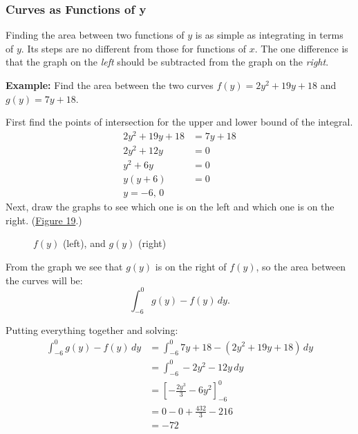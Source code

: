\documentclass[12pt]{article}
\begin{document}
\subsubsection{Curves as Functions of y}
Finding the area between two functions of $y$ is as simple as integrating in terms of $y$. Its steps are no different from those for functions of $x$. The one difference is that the graph on the \textit{left} should be subtracted from the graph on the \textit{right}.

\noindent \textbf{Example:} Find the area between the two curves $f(y)=2y^2 + 19y + 18$ and $g(y)=7y + 18$.

\noindent First find the points of intersection for the upper and lower bound of the integral.
\begin{align*}
    2y^2 + 19y + 18 & = 7y + 18 \\
    2y^2 + 12y      & = 0       \\
    y^2 + 6y        & = 0       \\
    y(y+6)          & = 0       \\
    y = -6, \, 0
\end{align*}
Next, draw the graphs to see which one is on the left and which one is on the right. (\hyperref[fig:abcy1]{Figure 19}.)

\begin{figure}[H]
    \begin{center}
        \caption{$f(y)$ (left), and $g(y)$ (right)}
        \label{fig:abcy1}
    \end{center}
\end{figure}

From the graph we see that $g(y)$ is on the right of $f(y)$, so the area between the curves will be:
\[ \int_{-6}^0 g(y) - f(y) \, dy. \]

\noindent Putting everything together and solving:
\begin{align*}
    \int_{-6}^0 g(y) - f(y) \, dy & = \int_{-6}^0 7y + 18 - (2y^2 + 19y + 18) \, dy \\
                                  & = \int_{-6}^0 -2y^2 - 12y \, dy                 \\
                                  & = \left[ -\frac{2y^3}{3} - 6y^2 \right]_{-6}^0  \\[6pt]
                                  & = 0 - 0 + \frac{432}{3} - 216                   \\[6pt]
                                  & = -72
\end{align*}
\end{document}
